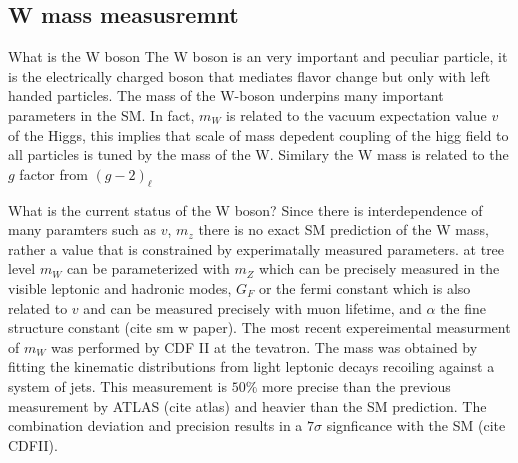 
\subsection{W mass measusremnt}

What is the W boson
The W boson is an very important and peculiar particle, it is the electrically charged boson that mediates flavor change but only with left handed particles.  The mass of the W-boson underpins many important parameters in the SM. In fact, $m_W$ is related to the vacuum expectation value $v$ of the Higgs, this implies that scale of mass depedent coupling of the higg field to all particles is tuned by the mass of the W. Similary the W mass is related to the $g$ factor from $(g-2)_\ell$ 

What is the current status of the W boson?
Since there is interdependence of many paramters such as $v$, $m_z$ there is no exact SM prediction of the W mass, rather a value that is constrained by experimatally measured parameters. at tree level $m_W$ can be parameterized with $m_Z$ which can be precisely measured in the visible leptonic and hadronic modes, $G_F$ or the fermi constant which is also related to $v$ and can be measured precisely with muon lifetime, and $\alpha$ the fine structure constant (cite sm w paper). The most recent expereimental measurment of $m_W$ was performed by CDF II at the tevatron. The mass was obtained by fitting the kinematic distributions from light leptonic decays recoiling against a system of jets. This measurement is $50\%$ more precise than the previous measurement by ATLAS (cite atlas) and heavier than the SM prediction. The combination deviation and precision results in a $7\sigma$ signficance with the SM (cite CDFII).  


